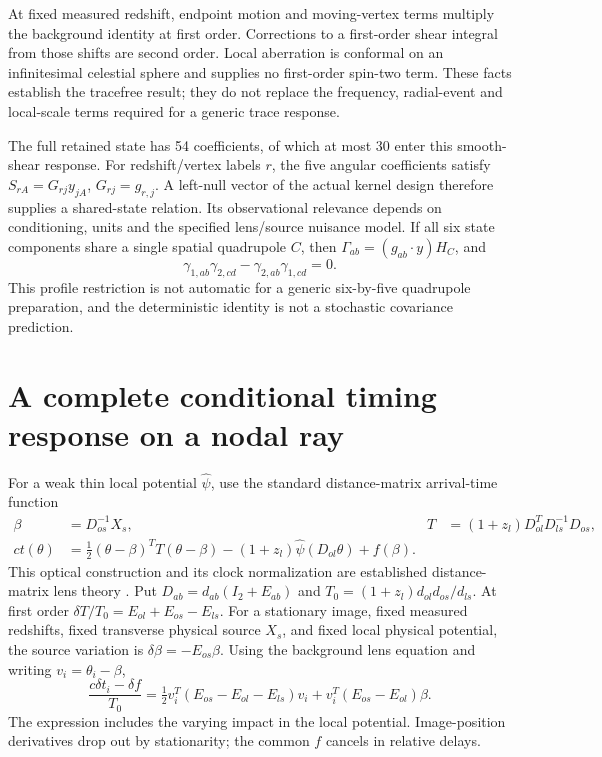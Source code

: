 At fixed measured redshift, endpoint motion and moving-vertex terms
multiply the background identity at first order.  Corrections to a
first-order shear integral from those shifts are second order.  Local
aberration is conformal on an infinitesimal celestial sphere and supplies
no first-order spin-two term.  These facts establish the tracefree result;
they do not replace the frequency, radial-event and local-scale terms
required for a generic trace response.

The full retained state has 54 coefficients, of which at most 30 enter
this smooth-shear response.  For redshift/vertex labels $r$,
the five angular coefficients satisfy $S_{rA}=G_{rj}y_{jA}$,
$G_{rj}=g_{r,j}$.  A left-null vector of the actual kernel design
therefore supplies a shared-state relation.  Its observational relevance
depends on conditioning, units and the specified lens/source nuisance model.
If all six state components share a single spatial quadrupole $C$,
then $\Gamma_{ab}=(g_{ab}\cdot y)H_C$, and
\begin{equation}
 \gamma_{1,ab}\gamma_{2,cd}-\gamma_{2,ab}\gamma_{1,cd}=0.
 \label{eq:common-profile-alignment}
\end{equation}
This profile restriction is not automatic for a generic six-by-five
quadrupole preparation, and the deterministic identity is not a
stochastic covariance prediction.

\section{A complete conditional timing response on a nodal ray}
\label{sec:nodal-timing}

For a weak thin local potential $\widehat\psi$, use the standard
distance-matrix arrival-time function
\begin{align}
 \beta&=D_{os}^{-1}X_s,
 &T&=(1+z_l)D_{ol}^TD_{ls}^{-1}D_{os},\nonumber\\
 ct(\theta)&=\tfrac12(\theta-\beta)^TT(\theta-\beta)
 -(1+z_l)\widehat\psi(D_{ol}\theta)+f(\beta).
 \label{eq:matrix-fermat}
\end{align}
This optical construction and its clock normalization are established
distance-matrix lens theory \cite{Fleury2021Arbitrary,Schneider2019Multiplane}.
Put $D_{ab}=d_{ab}(I_2+E_{ab})$ and
$T_0=(1+z_l)d_{ol}d_{os}/d_{ls}$.
At first order $\delta T/T_0=E_{ol}+E_{os}-E_{ls}$.
For a stationary image, fixed measured redshifts, fixed transverse
physical source $X_s$, and fixed local physical potential, the source
variation is $\delta\beta=-E_{os}\beta$.
Using the background lens equation and writing $v_i=\theta_i-\beta$,
\begin{equation}
 \frac{c\delta t_i-\delta f}{T_0}
 =\tfrac12v_i^T(E_{os}-E_{ol}-E_{ls})v_i
 +v_i^T(E_{os}-E_{ol})\beta.
 \label{eq:stationary-delay-response}
\end{equation}
The expression includes the varying impact in the local potential.
Image-position derivatives drop out by stationarity; the common $f$
cancels in relative delays.

